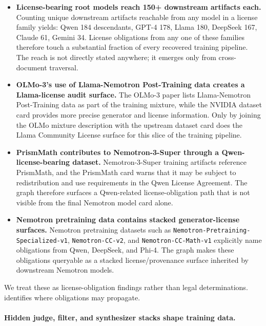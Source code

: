 \begin{itemize}
    \item \textbf{License-bearing root models reach 150+ downstream artifacts each.}
    Counting unique downstream artifacts reachable from any model in a license family yields: Qwen 184 descendants, GPT-4 178, Llama 180, DeepSeek 167, Claude 61, Gemini 34. License obligations from any one of these families therefore touch a substantial fraction of every recovered training pipeline. The reach is not directly stated anywhere; it emerges only from cross-document traversal.

    \item \textbf{OLMo-3's use of Llama-Nemotron Post-Training data creates a Llama-license audit surface.}
    The OLMo-3 paper lists Llama-Nemotron Post-Training data as part of the training mixture, while the NVIDIA dataset card provides more precise generator and license information. Only by joining the OLMo mixture description with the upstream dataset card does the Llama Community License surface for this slice of the training pipeline.

    \item \textbf{PrismMath contributes to Nemotron-3-Super through a Qwen-license-bearing dataset.}
    Nemotron-3-Super training artifacts reference PrismMath, and the PrismMath card warns that it may be subject to redistribution and use requirements in the Qwen License Agreement. The graph therefore surfaces a Qwen-related license-obligation path that is not visible from the final Nemotron model card alone.

    \item \textbf{Nemotron pretraining data contains stacked generator-license surfaces.}
    Nemotron pretraining datasets such as \texttt{Nemotron-Pretraining-Specialized-v1}, \texttt{Nemotron-CC-v2}, and \texttt{Nemotron-CC-Math-v1} explicitly name obligations from Qwen, DeepSeek, and Phi-4. The graph makes these obligations queryable as a stacked license/provenance surface inherited by downstream Nemotron models.
\end{itemize}

We treat these as license-obligation findings rather than legal determinations. \system{} identifies where obligations may propagate.

\paragraph{Hidden judge, filter, and synthesizer stacks shape training data.}

